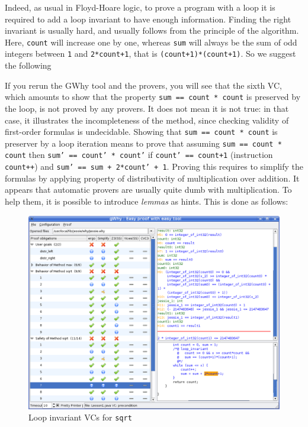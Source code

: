 \documentclass[a4paper,11pt,twoside,openright]{report}
\begin{document}
Indeed, as usual in Floyd-Hoare logic, to prove a program with a loop
it is required to add a loop invariant to have enough
information. 
Finding the right invariant is usually hard, and usually follows from the
principle of the algorithm. Here, \texttt{count} will increase one by
one, whereas \texttt{sum} will always be the sum of odd integers
between \texttt{1} and \texttt{2*count+1}, that is
\texttt{(count+1)*(count+1)}. So we suggest the following


If you rerun the GWhy tool and the provers, you will see that the
sixth VC, which amounts to show that the property \texttt{sum == count
  * count} is preserved by the loop, is not proved by any provers. It
does not mean it is not true: in that case, it illustrates the
incompleteness of the method, since checking validity of first-order
formulas is undecidable. Showing that \texttt{sum == count * count} is
preserver by a loop iteration means to prove that assuming \texttt{sum
  == count * count} then \texttt{sum'
  == count' * count'} if  \texttt{count' == count+1}  (instruction
\texttt{count++}) and \texttt{sum' == sum + 2*count' + 1}. Proving this
requires to simplify the formulas by applying property of
distributivity of multiplication over addition. It appears that
automatic provers are usually quite dumb with multiplication. To help
them, it is possible to introduce \emph{lemmas} as hints. This is done
as follows:


\begin{figure}[t]
  \begin{center}
    \includegraphics[width=\textwidth]{Lesson1_sqrt2.png}
  \end{center}
  \caption{Loop invariant VCs for \texttt{sqrt}}
\label{fig:sqrt2}
\hrulefill
\end{figure}
\end{document}
